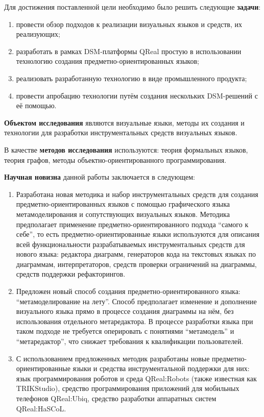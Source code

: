 Для достижения поставленной цели необходимо было решить следующие \textbf{задачи}:
\begin{enumerate}
	\item провести обзор подходов к реализации визуальных языков и средств, их реализующих;
	\item разработать в рамках \ac{DSM}-платформы QReal простую в использовании технологию создания предметно-ориентированных языков;
	\item реализовать разработанную технологию в виде промышленного продукта;
	\item провести апробацию технологии путём создания нескольких \ac{DSM}-решений с её помощью.
\end{enumerate}

\textbf{Объектом исследования} являются визуальные языки, методы их создания и технологии
для разработки инструментальных средств визуальных языков.

В качестве \textbf{методов исследования} используются: теория формальных языков, теория графов, 
методы объектно-ориентированного программирования.

\textbf{Научная новизна} данной работы заключается в следующем:
\begin{enumerate}
	\item Разработана новая методика и набор инструментальных средств для создания предметно-ориентированных 
		языков с помощью графического языка метамоделирования и сопутствующих визуальных языков.
		Методика предполагает применение предметно-ориентированного подхода "`самого к себе"', то есть
		предметно-ориентированные языки используются для описания всей функциональности разрабатываемых
		инструментальных средств для нового языка: редактора диаграмм, генераторов кода на текстовых языках по 
		диаграммам, интерпретаторов, средств проверки ограничений на диаграммы, средств поддержки рефакторингов.
	\item Предложен новый способ создания предметно-ориентированного языка: "`метамоделирование на лету"'. 
		Способ предполагает изменение и дополнение визуального языка прямо в процессе создания диаграммы на нём,
		без использования отдельного метаредактора. В процессе разработки языка при таком подходе
		не требуется оперировать с понятиями "`метамодель"' и "`метаредактор"', что снижает 
		требования к квалификации пользователей.
	\item С использованием предложенных методик разработаны новые предметно-ориентированные языки и
		средства инструментальной поддержки для них: язык программирования роботов и среда QReal:Robots
		(также известная как TRIKStudio), средство программирования приложений для мобильных телефонов 
		QReal:Ubiq, средство разработки аппаратных систем QReal:HaSCoL.
\end{enumerate}

